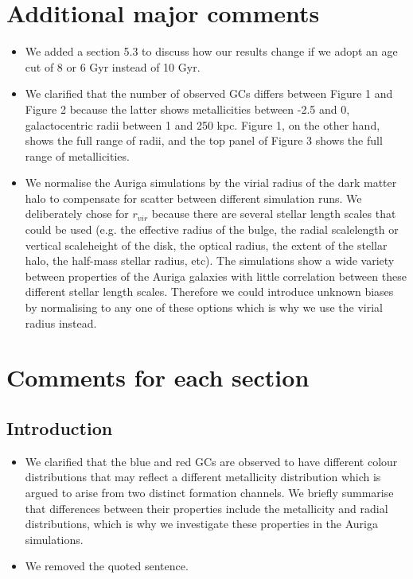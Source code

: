 \documentclass{article}
\begin{document}
\section*{Additional major comments}
\begin{itemize}
\item We added a section 5.3 to discuss how our results change if we adopt an
age cut of 8 or 6 Gyr instead of 10 Gyr.
\item We clarified that the number of observed GCs differs between Figure 1 and 
Figure 2 because the latter shows metallicities between -2.5 and 0, galactocentric 
radii between 1 and 250 kpc. Figure 1, on the other hand, shows the full range
of radii, and the top panel of Figure 3 shows the full range of metallicities.
\item We normalise the Auriga simulations by the virial radius of the
dark matter halo to compensate for scatter between different simulation runs. We
deliberately chose for $r_{vir}$ because there are several stellar length scales
that could be used (e.g. the effective radius of the bulge, the radial scalelength
or vertical scaleheight of the disk, the optical radius, the extent of the stellar 
halo, the half-mass stellar radius, etc). The simulations show a wide variety 
between properties of the Auriga galaxies with little correlation between these 
different stellar length scales. Therefore we could introduce unknown biases by 
normalising to any one of these options which is why we use the virial radius instead.

\end{itemize}


\section*{Comments for each section}
\subsection*{Introduction}
\begin{itemize}
\item We clarified that the blue and red GCs are observed to have different colour
distributions that may reflect a different metallicity distribution which is argued
to arise from two distinct formation channels. We briefly summarise that differences
between their properties include the metallicity and radial distributions, which
is why we investigate these properties in the Auriga simulations.
\item We removed the quoted sentence.
\end{itemize}
\end{document}
